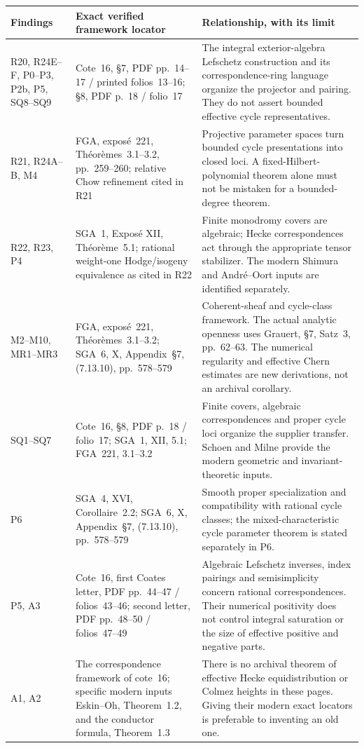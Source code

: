 \documentclass[11pt,a4paper]{article}
\theoremstyle{definition}\newtheorem{definition}[theorem]{Definition}
\theoremstyle{remark}\newtheorem{remark}[theorem]{Remark}
\begin{document}
\begingroup\small
\begin{longtable}{@{}>{\raggedright\arraybackslash}p{25mm}>{\raggedright\arraybackslash}p{44mm}>{\raggedright\arraybackslash}p{76mm}@{}}
\toprule
Findings & Exact verified framework locator & Relationship, with its limit\\
\midrule
\endhead
R20, R24E--F, P0--P3, P2b, P5, SQ8--SQ9 & Cote~16, \S7, PDF pp.~14--17 / printed folios~13--16; \S8, PDF p.~18 / folio~17 & The integral exterior-algebra Lefschetz construction and its correspondence-ring language organize the projector and pairing. They do not assert bounded effective cycle representatives.\\
R21, R24A--B, M4 & FGA, expos\'e~221, Th\'eor\`emes~3.1--3.2, pp.~259--260; relative Chow refinement cited in R21 & Projective parameter spaces turn bounded cycle presentations into closed loci. A fixed-Hilbert-polynomial theorem alone must not be mistaken for a bounded-degree theorem.\\
R22, R23, P4 & SGA~1, Expos\'e XII, Th\'eor\`eme~5.1; rational weight-one Hodge/isogeny equivalence as cited in R22 & Finite monodromy covers are algebraic; Hecke correspondences act through the appropriate tensor stabilizer. The modern Shimura and Andr\'e--Oort inputs are identified separately.\\
M2--M10, MR1--MR3 & FGA, expos\'e~221, Th\'eor\`emes~3.1--3.2; SGA~6, X, Appendix~\S7, (7.13.10), pp.~578--579 & Coherent-sheaf and cycle-class framework. The actual analytic openness uses Grauert, \S7, Satz~3, pp.~62--63. The numerical regularity and effective Chern estimates are new derivations, not an archival corollary.\\
SQ1--SQ7 & Cote~16, \S8, PDF p.~18 / folio~17; SGA~1, XII, 5.1; FGA~221, 3.1--3.2 & Finite covers, algebraic correspondences and proper cycle loci organize the supplier transfer. Schoen and Milne provide the modern geometric and invariant-theoretic inputs.\\
P6 & SGA~4, XVI, Corollaire~2.2; SGA~6, X, Appendix~\S7, (7.13.10), pp.~578--579 & Smooth proper specialization and compatibility with rational cycle classes; the mixed-characteristic cycle parameter theorem is stated separately in P6.\\
P5, A3 & Cote~16, first Coates letter, PDF pp.~44--47 / folios~43--46; second letter, PDF pp.~48--50 / folios~47--49 & Algebraic Lefschetz inverses, index pairings and semisimplicity concern rational correspondences. Their numerical positivity does not control integral saturation or the size of effective positive and negative parts.\\
A1, A2 & The correspondence framework of cote~16; specific modern inputs Eskin--Oh, Theorem~1.2, and the conductor formula, Theorem~1.3 & There is no archival theorem of effective Hecke equidistribution or Colmez heights in these pages. Giving their modern exact locators is preferable to inventing an old one.\\
\bottomrule
\end{longtable}
\endgroup
\end{document}

